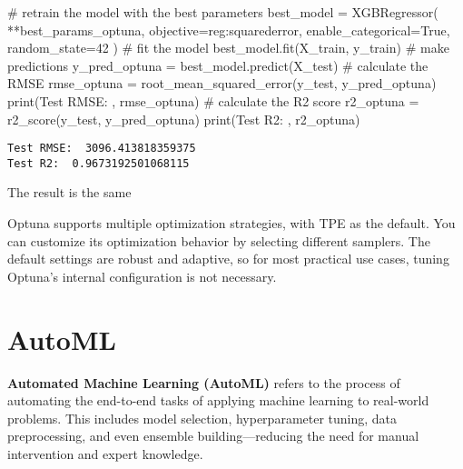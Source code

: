 \documentclass[
  letterpaper,
  DIV=11,
  numbers=noendperiod]{scrreprt}
\newenvironment{Shaded}{\begin{snugshade}}{\end{snugshade}}
\newcommand{\BuiltInTok}[1]{\textcolor[rgb]{0.00,0.23,0.31}{#1}}
\newcommand{\CommentTok}[1]{\textcolor[rgb]{0.37,0.37,0.37}{#1}}
\newcommand{\DecValTok}[1]{\textcolor[rgb]{0.68,0.00,0.00}{#1}}
\newcommand{\NormalTok}[1]{\textcolor[rgb]{0.00,0.23,0.31}{#1}}
\newcommand{\OperatorTok}[1]{\textcolor[rgb]{0.37,0.37,0.37}{#1}}
\newcommand{\StringTok}[1]{\textcolor[rgb]{0.13,0.47,0.30}{#1}}
\newcommand{\VariableTok}[1]{\textcolor[rgb]{0.07,0.07,0.07}{#1}}
\begin{document}
\begin{Shaded}
\begin{Highlighting}[]
\CommentTok{\# retrain the model with the best parameters}
\NormalTok{best\_model }\OperatorTok{=}\NormalTok{ XGBRegressor(}
    \OperatorTok{**}\NormalTok{best\_params\_optuna,}
\NormalTok{    objective}\OperatorTok{=}\StringTok{\textquotesingle{}reg:squarederror\textquotesingle{}}\NormalTok{,}
\NormalTok{    enable\_categorical}\OperatorTok{=}\VariableTok{True}\NormalTok{,}
\NormalTok{    random\_state}\OperatorTok{=}\DecValTok{42}
\NormalTok{)}
\CommentTok{\# fit the model}
\NormalTok{best\_model.fit(X\_train, y\_train)}
\CommentTok{\# make predictions}
\NormalTok{y\_pred\_optuna }\OperatorTok{=}\NormalTok{ best\_model.predict(X\_test)}
\CommentTok{\# calculate the RMSE}
\NormalTok{rmse\_optuna }\OperatorTok{=}\NormalTok{ root\_mean\_squared\_error(y\_test, y\_pred\_optuna)}
\BuiltInTok{print}\NormalTok{(}\StringTok{\textquotesingle{}Test RMSE: \textquotesingle{}}\NormalTok{, rmse\_optuna)}
\CommentTok{\# calculate the R2 score}
\NormalTok{r2\_optuna }\OperatorTok{=}\NormalTok{ r2\_score(y\_test, y\_pred\_optuna)}
\BuiltInTok{print}\NormalTok{(}\StringTok{\textquotesingle{}Test R2: \textquotesingle{}}\NormalTok{, r2\_optuna)}
\end{Highlighting}
\end{Shaded}

\begin{verbatim}
Test RMSE:  3096.413818359375
Test R2:  0.9673192501068115
\end{verbatim}

The result is the same

Optuna supports multiple optimization strategies, with TPE as the
default. You can customize its optimization behavior by selecting
different samplers. The default settings are robust and adaptive, so for
most practical use cases, tuning Optuna's internal configuration is not
necessary.

\section{AutoML}\label{automl}

\textbf{Automated Machine Learning (AutoML)} refers to the process of
automating the end-to-end tasks of applying machine learning to
real-world problems. This includes model selection, hyperparameter
tuning, data preprocessing, and even ensemble building---reducing the
need for manual intervention and expert knowledge.
\end{document}
